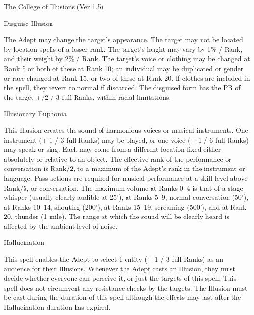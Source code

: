 \begin{Chapter}{The College of Illusions (Ver 1.5)}
\begin{spell}[S-5]{Disguise Illusion}

\begin{effects}
The Adept may change the target’s appearance.  The target may not be
located by location spells of a lesser rank. The target’s height may
vary by 1\% / Rank, and their weight by 2\% / Rank.  The target’s
voice or clothing may be changed at Rank 5 or both of these at Rank
10; an individual may be duplicated or gender or race changed at Rank
15, or two of these at Rank 20. If clothes are included in the spell,
they revert to normal if discarded. The disguised form has the PB of
the target +/2 / 3 full Ranks, within racial limitations.
\end{effects}
\end{spell}

\begin{spell}[S-6]{Illusionary Euphonia}

\begin{effects}
This Illusion creates the sound of harmonious voices or musical
instruments.  One instrument (+ 1 / 3 full Ranks) may be played, or
one voice (+ 1 / 6 full Ranks) may speak or sing. Each may come from a
different location fixed either absolutely or relative to an object.
The effective rank of the performance or conversation is Rank/2, to a
maximum of the Adept’s rank in the instrument or language.  Pass
actions are required for musical performance at a skill level above
Rank/5, or conversation. The maximum volume at Ranks 0--4 is that of a
stage whisper (usually clearly audible at 25’), at Ranks 5--9, normal
conversation (50’), at Ranks 10--14, shouting (200’), at Ranks 15--19,
screaming (500’), and at Rank 20, thunder (1 mile).  The range at
which the sound will be clearly heard is affected by the ambient level
of noise.
\end{effects}
\end{spell}

\begin{spell}[S-7]{Hallucination}

\begin{effects}
This spell enables the Adept to select 1 entity (+ 1 / 3 full Ranks)
as an audience for their Illusions.  Whenever the Adept casts an
Illusion, they must decide whether everyone can perceive it, or just
the targets of this spell.  This spell does not circumvent any
resistance checks by the targets.  The Illusion must be cast during
the duration of this spell although the effects may last after the
Hallucination duration has expired.
\end{effects}
\end{spell}


\end{Chapter}
